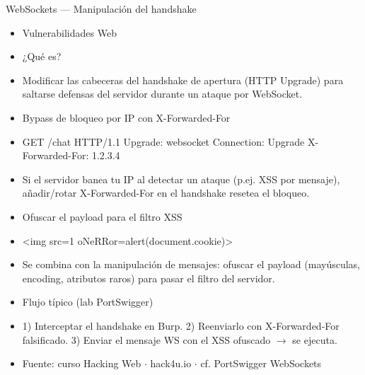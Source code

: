 \documentclass[aspectratio=169,10pt]{beamer}
\begin{document}
\begin{frame}[allowframebreaks]{WebSockets --- Manipulación del handshake}
\small
  \begin{itemize}
  \item Vulnerabilidades Web
  \item ¿Qué es?
  \item Modificar las cabeceras del handshake de apertura (HTTP Upgrade) para saltarse defensas del servidor durante un ataque por WebSocket.
  \item Bypass de bloqueo por IP con X-Forwarded-For
  \item GET /chat HTTP/1.1 Upgrade: websocket Connection: Upgrade X-Forwarded-For: 1.2.3.4
  \item Si el servidor banea tu IP al detectar un ataque (p.ej. XSS por mensaje), añadir/rotar X-Forwarded-For en el handshake resetea el bloqueo.
  \item Ofuscar el payload para el filtro XSS
  \item \textless{}img src=1 oNeRRor=alert(document.cookie)\textgreater{}
  \item Se combina con la manipulación de mensajes: ofuscar el payload (mayúsculas, encoding, atributos raros) para pasar el filtro del servidor.
  \item Flujo típico (lab PortSwigger)
  \item 1) Interceptar el handshake en Burp. 2) Reenviarlo con X-Forwarded-For falsificado. 3) Enviar el mensaje WS con el XSS ofuscado $\rightarrow$ se ejecuta.
  \item Fuente: curso Hacking Web $\cdot$ hack4u.io $\cdot$ cf. PortSwigger WebSockets
  \end{itemize}
\end{frame}
\end{document}
